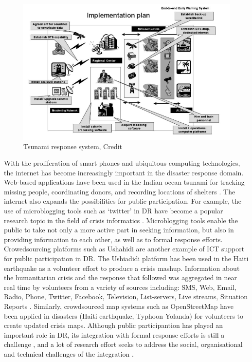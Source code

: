 \begin{figure}[h]
  \centering
  \includegraphics[width=1\textwidth]{img/Background/ICTExample}
  \caption{Tsunami response system, Credit \cite{Wattegama2012} }
  \label{fig:ICTExample}
\end{figure}

With the proliferation of smart phones and ubiquitous computing technologies, the internet has become increasingly important in the disaster response domain. Web-based applications have been used in the Indian ocean tsunami for tracking missing people, coordinating donors, and recording locations of shelters \citep{Wattegama2012}. The internet also expands the possibilities for public participation. For example, the use of microblogging tools such as `twitter' in \ac{DR} have become a popular research topic in the field of crisis informatics \citep{Kogan2012,Sarcevic2012,Starbird2010}.  Microblogging tools enable the public to take not only a more active part in seeking information, but also in providing information to each other, as well as to formal response efforts. Crowedsourcing platforms such as Ushahidi \citep{Morrow2011} are another example of \ac{ICT} support for public participation in \ac{DR}. The Ushiadidi platform has been used in the Haiti earthquake as a volunteer effort to produce a crisis mashup. Information about the humanitarian crisis and the response that followed was aggregated in near real time by volunteers from a variety of sources including: SMS, Web, Email, Radio, Phone, Twitter, Facebook, Television, List-servers, Live streams, Situation Reports \citep{Morrow2011}. Similarly, crowdsourced map systems such as OpenStreetMap \citep{Palen2015} have been applied in disasters (Haiti earthquake, Typhoon Yolanda) for volunteers to create updated crisis maps. Although public participantion has played an important role in \ac{DR}, its integration with formal response efforts is still a challenge \citep{Palen2007}, and a lot of research effort seeks to address the social, organisational and technical challenges of the integration \citep{Dashti2014,Sutton2008}.   \\

